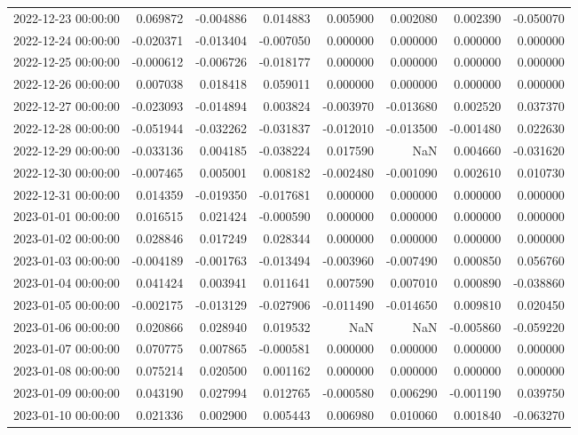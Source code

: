 \begin{tabular}{lrrrrrrr}
2022-12-23 00:00:00 & 0.069872 & -0.004886 & 0.014883 & 0.005900 & 0.002080 & 0.002390 & -0.050070 \\
2022-12-24 00:00:00 & -0.020371 & -0.013404 & -0.007050 & 0.000000 & 0.000000 & 0.000000 & 0.000000 \\
2022-12-25 00:00:00 & -0.000612 & -0.006726 & -0.018177 & 0.000000 & 0.000000 & 0.000000 & 0.000000 \\
2022-12-26 00:00:00 & 0.007038 & 0.018418 & 0.059011 & 0.000000 & 0.000000 & 0.000000 & 0.000000 \\
2022-12-27 00:00:00 & -0.023093 & -0.014894 & 0.003824 & -0.003970 & -0.013680 & 0.002520 & 0.037370 \\
2022-12-28 00:00:00 & -0.051944 & -0.032262 & -0.031837 & -0.012010 & -0.013500 & -0.001480 & 0.022630 \\
2022-12-29 00:00:00 & -0.033136 & 0.004185 & -0.038224 & 0.017590 & NaN & 0.004660 & -0.031620 \\
2022-12-30 00:00:00 & -0.007465 & 0.005001 & 0.008182 & -0.002480 & -0.001090 & 0.002610 & 0.010730 \\
2022-12-31 00:00:00 & 0.014359 & -0.019350 & -0.017681 & 0.000000 & 0.000000 & 0.000000 & 0.000000 \\
2023-01-01 00:00:00 & 0.016515 & 0.021424 & -0.000590 & 0.000000 & 0.000000 & 0.000000 & 0.000000 \\
2023-01-02 00:00:00 & 0.028846 & 0.017249 & 0.028344 & 0.000000 & 0.000000 & 0.000000 & 0.000000 \\
2023-01-03 00:00:00 & -0.004189 & -0.001763 & -0.013494 & -0.003960 & -0.007490 & 0.000850 & 0.056760 \\
2023-01-04 00:00:00 & 0.041424 & 0.003941 & 0.011641 & 0.007590 & 0.007010 & 0.000890 & -0.038860 \\
2023-01-05 00:00:00 & -0.002175 & -0.013129 & -0.027906 & -0.011490 & -0.014650 & 0.009810 & 0.020450 \\
2023-01-06 00:00:00 & 0.020866 & 0.028940 & 0.019532 & NaN & NaN & -0.005860 & -0.059220 \\
2023-01-07 00:00:00 & 0.070775 & 0.007865 & -0.000581 & 0.000000 & 0.000000 & 0.000000 & 0.000000 \\
2023-01-08 00:00:00 & 0.075214 & 0.020500 & 0.001162 & 0.000000 & 0.000000 & 0.000000 & 0.000000 \\
2023-01-09 00:00:00 & 0.043190 & 0.027994 & 0.012765 & -0.000580 & 0.006290 & -0.001190 & 0.039750 \\
2023-01-10 00:00:00 & 0.021336 & 0.002900 & 0.005443 & 0.006980 & 0.010060 & 0.001840 & -0.063270 \\

\end{tabular}
